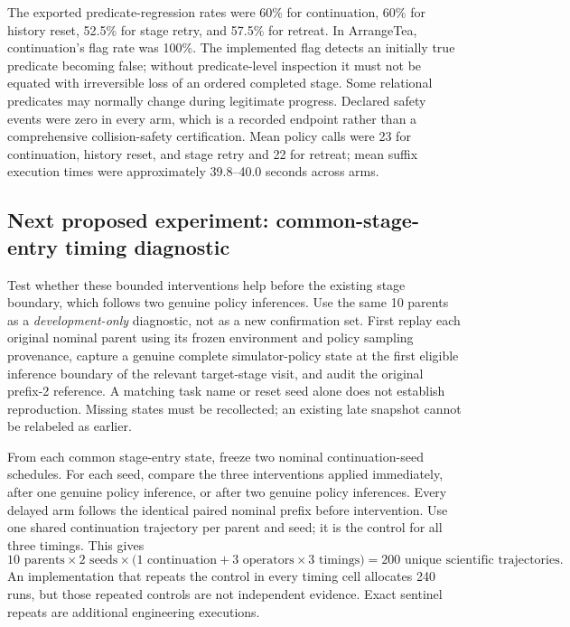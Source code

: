 The exported predicate-regression rates were 60\% for continuation, 60\% for history reset, 52.5\% for stage retry, and 57.5\% for retreat. In ArrangeTea, continuation's flag rate was 100\%. The implemented flag detects an initially true predicate becoming false; without predicate-level inspection it must not be equated with irreversible loss of an ordered completed stage. Some relational predicates may normally change during legitimate progress. Declared safety events were zero in every arm, which is a recorded endpoint rather than a comprehensive collision-safety certification. Mean policy calls were 23 for continuation, history reset, and stage retry and 22 for retreat; mean suffix execution times were approximately 39.8--40.0 seconds across arms.


\subsection{Next proposed experiment: common-stage-entry timing diagnostic}

\label{sec:next-timing-study}
Test whether these bounded interventions help before the existing stage boundary, which follows two genuine policy inferences. Use the same 10 parents as a \emph{development-only} diagnostic, not as a new confirmation set. First replay each original nominal parent using its frozen environment and policy sampling provenance, capture a genuine complete simulator-policy state at the first eligible inference boundary of the relevant target-stage visit, and audit the original prefix-2 reference. A matching task name or reset seed alone does not establish reproduction. Missing states must be recollected; an existing late snapshot cannot be relabeled as earlier.

From each common stage-entry state, freeze two nominal continuation-seed schedules. For each seed, compare the three interventions applied immediately, after one genuine policy inference, or after two genuine policy inferences. Every delayed arm follows the identical paired nominal prefix before intervention. Use one shared continuation trajectory per parent and seed; it is the control for all three timings. This gives
\[
10\text{ parents}\times2\text{ seeds}\times
\bigl(1\text{ continuation}+3\text{ operators}\times3\text{ timings}\bigr)
=\boxed{200\text{ unique scientific trajectories}}.
\]
An implementation that repeats the control in every timing cell allocates 240 runs, but those repeated controls are not independent evidence. Exact sentinel repeats are additional engineering executions.

